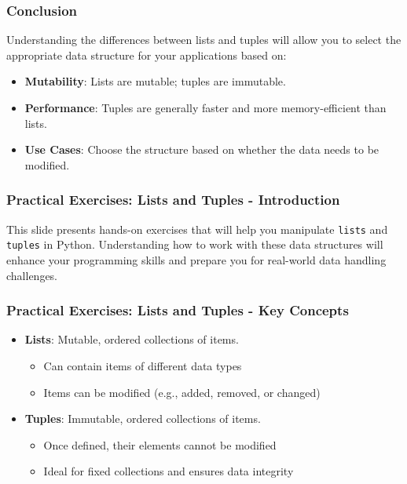 \documentclass{beamer}
\begin{document}
\begin{frame}[fragile]
    \frametitle{Conclusion}
    Understanding the differences between lists and tuples will allow you to select the appropriate data structure for your applications based on:
    \begin{itemize}
        \item \textbf{Mutability}: Lists are mutable; tuples are immutable.
        \item \textbf{Performance}: Tuples are generally faster and more memory-efficient than lists.
        \item \textbf{Use Cases}: Choose the structure based on whether the data needs to be modified.
    \end{itemize}
\end{frame}

\begin{frame}[fragile]
    \frametitle{Practical Exercises: Lists and Tuples - Introduction}
    This slide presents hands-on exercises that will help you manipulate \texttt{lists} and \texttt{tuples} in Python. 
    Understanding how to work with these data structures will enhance your programming skills and prepare you for real-world data handling challenges.
\end{frame}

\begin{frame}[fragile]
    \frametitle{Practical Exercises: Lists and Tuples - Key Concepts}
    \begin{itemize}
        \item \textbf{Lists}: Mutable, ordered collections of items. 
        \begin{itemize}
            \item Can contain items of different data types
            \item Items can be modified (e.g., added, removed, or changed)
        \end{itemize}
        \item \textbf{Tuples}: Immutable, ordered collections of items.
        \begin{itemize}
            \item Once defined, their elements cannot be modified
            \item Ideal for fixed collections and ensures data integrity
        \end{itemize}
    \end{itemize}
\end{frame}
\end{document}
